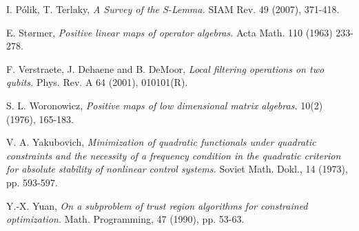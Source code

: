 \documentclass[10pt]{article}
\theoremstyle{plain}
\theoremstyle{definition}
\theoremstyle{remark}
\begin{document}
\begin{thebibliography}{10}
 I. P\'olik, T. Terlaky,  
{\sl A Survey of the S-Lemma.} SIAM Rev. 49 (2007), 371-418.

E. St{\o}rmer, 
{\em  Positive linear maps of operator algebras.} 
 {Acta Math.} 110 (1963) 233-278. 

F. Verstraete, J. Dehaene and B. DeMoor,
{\em Local filtering operations on two qubits.}
Phys. Rev. A 64 (2001), 010101(R).
 
S. L. Woronowicz, 
{\em Positive maps of low dimensional matrix algebras.} 
 10(2) (1976), 165-183. 

 V. A. Yakubovich, 
 {\em Minimization of quadratic functionals under quadratic constraints and
the necessity of a frequency condition in the quadratic criterion for absolute stability of
nonlinear control systems.}  Soviet Math. Dokl., 14 (1973), pp. 593-597. 
 
  Y.-X. Yuan, 
 {\em On a subproblem of trust region algorithms for constrained optimization.} 
  Math. Programming, 47 (1990), pp. 53-63.


\end{thebibliography}
\end{document}
